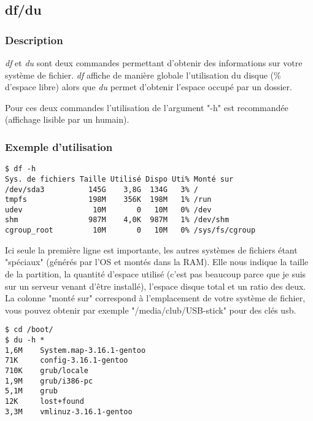 \subsection*{df/du}
\subsubsection*{Description}
\emph{df} et \emph{du} sont deux commandes permettant d'obtenir des informations sur votre système de fichier.
\emph{df} affiche de manière globale l'utilisation du disque (\% d'espace libre) alors que \emph{du} permet d'obtenir l'espace occupé par un dossier.

\noindent Pour ces deux commandes l'utilisation de l'argument "-h" est recommandée (affichage lisible par un humain).

\subsubsection*{Exemple d'utilisation}

\begin{lstlisting}
$ df -h
Sys. de fichiers Taille Utilisé Dispo Uti% Monté sur
/dev/sda3          145G    3,8G  134G   3% /
tmpfs              198M    356K  198M   1% /run
udev                10M       0   10M   0% /dev
shm                987M    4,0K  987M   1% /dev/shm
cgroup_root         10M       0   10M   0% /sys/fs/cgroup
\end{lstlisting}

Ici seule la première ligne est importante, les autres systèmes de fichiers étant "spéciaux" (générés par l'OS et montés dans la RAM).
Elle nous indique la taille de la partition, la quantité d'espace utilisé (c'est pas beaucoup parce que je suis sur un serveur venant d'être installé), l'espace disque total et un ratio des deux.
La colonne "monté sur" correspond à l'emplacement de votre système de fichier, vous pouvez obtenir par exemple "/media/club/USB-stick" pour des clés usb.

\begin{lstlisting}
$ cd /boot/
$ du -h *
1,6M    System.map-3.16.1-gentoo
71K     config-3.16.1-gentoo
710K    grub/locale
1,9M    grub/i386-pc
5,1M    grub
12K     lost+found
3,3M    vmlinuz-3.16.1-gentoo
\end{lstlisting}
